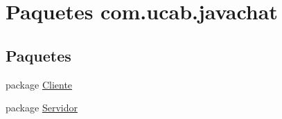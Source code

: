 \hypertarget{namespacecom_1_1ucab_1_1javachat}{\section{Paquetes com.\-ucab.\-javachat}
\label{namespacecom_1_1ucab_1_1javachat}
}
\subsection*{Paquetes}
\begin{DoxyCompactItemize}
\item 
package \hyperlink{namespacecom_1_1ucab_1_1javachat_1_1_cliente}{Cliente}
\item 
package \hyperlink{namespacecom_1_1ucab_1_1javachat_1_1_servidor}{Servidor}
\end{DoxyCompactItemize}
